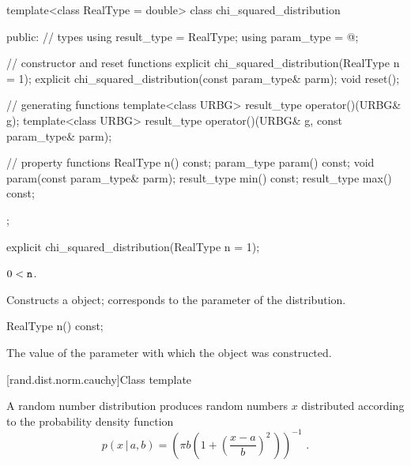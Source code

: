 %
\begin{codeblock}
template<class RealType = double>
  class chi_squared_distribution {
  public:
    // types
    using result_type = RealType;
    using param_type  = @\unspec@;

    // constructor and reset functions
    explicit chi_squared_distribution(RealType n = 1);
    explicit chi_squared_distribution(const param_type& parm);
    void reset();

    // generating functions
    template<class URBG>
      result_type operator()(URBG& g);
    template<class URBG>
      result_type operator()(URBG& g, const param_type& parm);

    // property functions
    RealType n() const;
    param_type param() const;
    void param(const param_type& parm);
    result_type min() const;
    result_type max() const;
  };
\end{codeblock}


%
\begin{itemdecl}
explicit chi_squared_distribution(RealType n = 1);
\end{itemdecl}

\begin{itemdescr}
\pnum
\requires $0 < \texttt{n}$.

\pnum
\effects Constructs a  object;
 corresponds to the parameter of the distribution.
\end{itemdescr}

%
\begin{itemdecl}
RealType n() const;
\end{itemdecl}

\begin{itemdescr}
\pnum\returns The value of the  parameter
 with which the object was constructed.
\end{itemdescr}


[rand.dist.norm.cauchy]{Class template }%
%
%

\pnum
A  random number distribution
produces random numbers $x$
distributed according to
the probability density function%
%
%
\[  p(x\,|\,a,b) = \left(\pi b \left(1 + \left(\frac{x-a}{b} \right)^2 \, \right)\right)^{-1} \text{ .} \]


